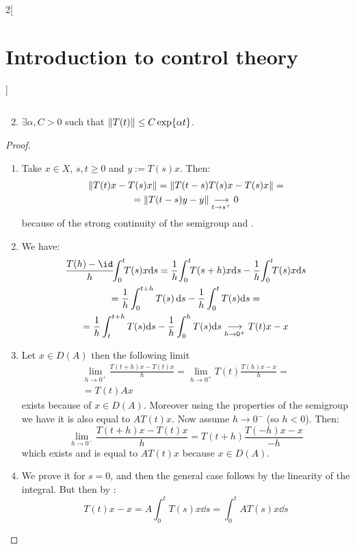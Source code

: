 \documentclass[../../../main_math.tex]{subfiles}
\begin{document}
\begin{multicols}{2}[\section{Introduction to control theory}]
\begin{proposition}
\begin{enumerate}
$$            $$
      \item $\exists \alpha,C>0$ such that $\norm{T(t)}\leq C\exp{\alpha t}$.
    \end{enumerate}
  \end{proposition}
  \begin{proof}\hfill
    \begin{enumerate}
      \item Take $x\in X$, $s,t\geq 0$ and $y:=T(s)x$. Then:
            \begin{multline*}
              \norm{T(t)x-T(s)x}=\norm{T(t-s)T(s)x-T(s)x}=\\
              =\norm{T(t-s)y-y}\underset{t\to s^+}{\longrightarrow} 0
            \end{multline*}
            because of the strong continuity of the semigroup and .
      \item We have:
            \begin{multline*}
              \frac{T(h)-\id}{h}\!\! \int_0^t\!\! T(s)x\dd s = \frac{1}{h}\!\int_0^t\!\!T(s+h) x\dd s - \frac{1}{h}\!\int_0^t\!\! T(s)x\dd s \\
              = \frac{1}{h}\int_0^{t+h}T(s)\dd{s}-\frac{1}{h}\int_0^t T(s)\dd s=\\=\frac{1}{h}\int_t^{t+h}T(s)\dd s-\frac{1}{h}\int_0^h T(s)\dd s\underset{h\to 0^+}{\longrightarrow} T(t)x-x
            \end{multline*}
      \item Let $x\in D(A)$ then the following limit
            \begin{multline*}
              \lim_{h\to 0^+}\frac{T(t+h)x-T(t)x}{h}=\lim_{h\to 0^+}T(t) \frac{T(h)x-x}{h}=\\=T(t)Ax
            \end{multline*}
            exists because of $x\in D(A)$. Moreover using the properties of the semigroup we have it is also equal to $AT(t)x$. Now assume $h\to 0^-$ (so $h<0$). Then:
            \begin{equation*}
              \lim_{h\to 0^-}\frac{T(t+h)x-T(t)x}{h}=T(t+h)\frac{T(-h)x-x}{-h}
            \end{equation*}
            which exists and is equal to $AT(t)x$ because $x\in D(A)$.
      \item We prove it for $s=0$, and then the general case follows by the linearity of the integral. But then by :
            \begin{equation*}
              T(t)x-x= A\int_0^t T(s)x\dd s=\int_0^t AT(s)x\dd s

\end{equation*}
\end{enumerate}
\end{proof}
\end{multicols}
\end{document}
